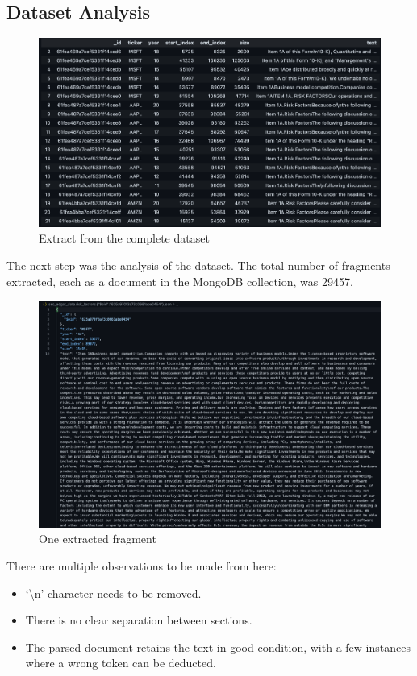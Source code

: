 \documentclass[12pt,MSc,a4paper,oneside]{muthesis}
\begin{document}
\clearpage

\subsection{Dataset Analysis}

\begin{figure}[h]
    \centering
    \includegraphics[scale=0.4]{dataset_analysis/extract_dataset.png}
    \caption{Extract from the complete dataset}
\end{figure}

The next step was the analysis of the dataset. The total number of fragments extracted, each as a document in the MongoDB collection, was 29457.

\begin{figure}[h]
    \centering
    \includegraphics[scale=0.2]{dataset_analysis/example_fragment.png}
    \caption{One extracted fragment}
\end{figure}

There are multiple observations to be made from here:
\begin{itemize}
    \item ‘\textbackslash n’ character needs to be removed.
    \item There is no clear separation between sections.
    \item The parsed document retains the text in good condition, with a few instances where a wrong token can be deducted.
\end{itemize}
\end{document}
